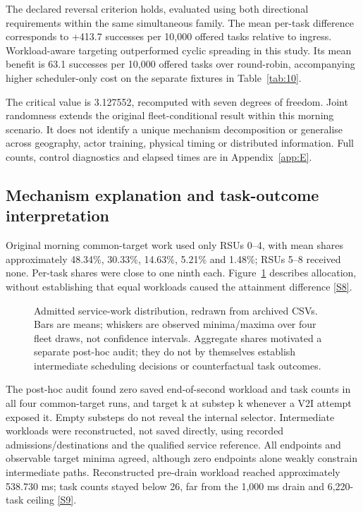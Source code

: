 \documentclass[11pt,a4paper]{article}
\begin{document}
The declared reversal criterion holds, evaluated using both directional requirements within the same simultaneous family. The mean per-task difference corresponds to +413.7 successes per 10,000 offered tasks relative to ingress. Workload-aware targeting outperformed cyclic spreading in this study. Its mean benefit is 63.1 successes per 10,000 offered tasks over round-robin, accompanying higher scheduler-only cost on the separate fixtures in Table~\ref{tab:10}.

The critical value is 3.127552, recomputed with seven degrees of freedom. Joint randomness extends the original fleet-conditional result within this morning scenario. It does not identify a unique mechanism decomposition or generalise across geography, actor training, physical timing or distributed information. Full counts, control diagnostics and elapsed times are in Appendix~\ref{app:E}.

\subsection{Mechanism explanation and task-outcome interpretation}\label{sec:3.5}

Original morning common-target work used only RSUs 0--4, with mean shares approximately 48.34\%, 30.33\%, 14.63\%, 5.21\% and 1.48\%; RSUs 5--8 received none. Per-task shares were close to one ninth each. Figure~\ref{fig:5} describes allocation, without establishing that equal workloads caused the attainment difference \hyperref[source-s8]{[S8]}.

\begin{figure}[htbp]
\centering

\caption{Admitted service-work distribution, redrawn from archived CSVs. Bars are means; whiskers are observed minima/maxima over four fleet draws, not confidence intervals. Aggregate shares motivated a separate post-hoc audit; they do not by themselves establish intermediate scheduling decisions or counterfactual task outcomes.}\label{fig:5}
\end{figure}

The post-hoc audit found zero saved end-of-second workload and task counts in all four common-target runs, and target k at substep k whenever a V2I attempt exposed it. Empty substeps do not reveal the internal selector. Intermediate workloads were reconstructed, not saved directly, using recorded admissions/destinations and the qualified service reference. All endpoints and observable target minima agreed, although zero endpoints alone weakly constrain intermediate paths. Reconstructed pre-drain workload reached approximately 538.730 ms; task counts stayed below 26, far from the 1,000 ms drain and 6,220-task ceiling \hyperref[source-s9]{[S9]}.
\end{document}

